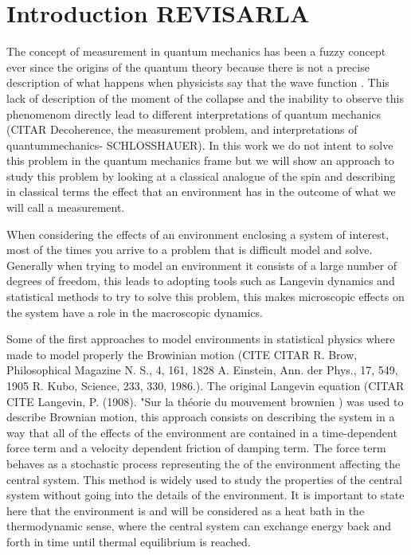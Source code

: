 \chapter{Introduction REVISARLA}

The concept of measurement in quantum mechanics has been a fuzzy concept ever since the origins of the quantum theory because there is not a precise description of what happens when physicists say that the wave function . This lack of description of the moment of the collapse and the inability to observe this phenomenom directly lead to different interpretations of quantum mechanics (CITAR Decoherence, the measurement problem, and interpretations of quantummechanics- SCHLOSSHAUER). In this work we do not intent to solve this problem in the quantum mechanics frame but we will show an approach to study this problem by looking at a classical analogue of the spin and describing in classical terms the effect that an environment has in the outcome of what we will call a measurement. \par

When considering the effects of an environment enclosing a system of interest, most of the times you arrive to a problem that is difficult model and solve. Generally when trying to model an environment it consists of a large number of degrees of freedom, this leads to adopting tools such as Langevin dynamics and statistical methods to try to solve this problem, this makes microscopic effects on the system have a role in the macroscopic dynamics.\par 

Some of the first approaches to model environments in statistical physics where made to model properly the Browinian motion (CITE CITAR R. Brow, Philosophical Magazine N. S., 4, 161, 1828 A. Einstein, Ann. der Phys., 17, 549, 1905 R. Kubo, Science, 233, 330, 1986.). The original Langevin equation (CITAR CITE Langevin, P. (1908). "Sur la théorie du mouvement brownien ) was used to describe Brownian motion, this approach consists on describing the system in a way that all of the effects of the environment are contained in a time-dependent force term and a velocity dependent friction of damping term. The force term behaves as a stochastic process representing the  of the environment affecting the central system. This method is widely used to study the properties of the central system without going into the details of the environment. It is important to state here that the environment is and will be  considered as a heat bath in the thermodynamic sense, where the central system can exchange energy back and forth in time until thermal equilibrium is reached.\par 

